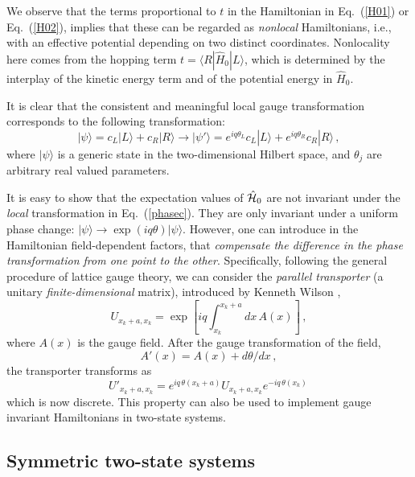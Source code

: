 \documentclass[aps,pra,reprint, superscriptaddress,amsmath,showpacs,longbibliography]{revtex4-2}
\renewcommand{\eqref}[1]{\mbox{Eq.~(\ref{#1})}}
\newcommand{\be}{\begin{equation}}
\newcommand{\ee}{\end{equation}}
\begin{document}
We observe that the terms proportional to $t$ in the Hamiltonian in \eqref{H01} or \eqref{H02}, implies that these can be regarded as {\em nonlocal} Hamiltonians, i.e., with an effective potential depending on two distinct coordinates. Nonlocality here comes from the hopping term  $t = \langle R | \hat H_0 | L \rangle$, which is determined by the interplay of the kinetic energy term and of the potential energy in $\hat H_0$.


It is clear that the consistent and meaningful local gauge transformation corresponds to the following transformation:
\be\label{phasec}
| \psi \rangle = c_L |L \rangle + c_R | R \rangle 
\to | \psi' \rangle = e^{i q \theta_L} c_L |L \rangle + e^{i q \theta_R}  c_R | R \rangle\, ,
\ee
where $| \psi \rangle$ is a generic state in the two-dimensional Hilbert space, and $\theta_j$ are arbitrary real valued parameters. 

It is easy to show that the expectation values of $\hat {\cal H}_0$ are not invariant under the {\em local } transformation in \eqref{phasec}.
They are only invariant under a uniform phase change: $| \psi \rangle \to \exp(i q \theta)| \psi \rangle$.
 However, one can introduce in the Hamiltonian field-dependent factors, that {\em compensate the difference in the phase transformation from one point to the other}. Specifically, following the general procedure of lattice gauge theory, we can {consider} the {\em parallel transporter} (a unitary {\it finite-dimensional} matrix), introduced by Kenneth Wilson \cite{Wilson1974,Lang2010,Wiese2013}, 
\be\label{W1}
U_{x_k +a,x_k} = \exp{\left[ i q \int_{x_k}^{x_k+a} dx\, A(x)   \right]}\, ,
\ee 
where $A(x)$ is the gauge field. After the gauge {transformation} of the field, 
\be
A'(x) = A(x) + d \theta / dx\, ,
\ee
the transporter transforms as
\be\label{W2}
U'_{x_k +a,x_k} = e^{i q\, \theta(x_k+a)} U_{x_k +a,x_k} e^{-i q\, \theta(x_k)}\, 
\ee
which is now discrete.
This property can  also be used to implement gauge invariant Hamiltonians in two-state systems.

\subsection{Symmetric two-state systems}
\end{document}

